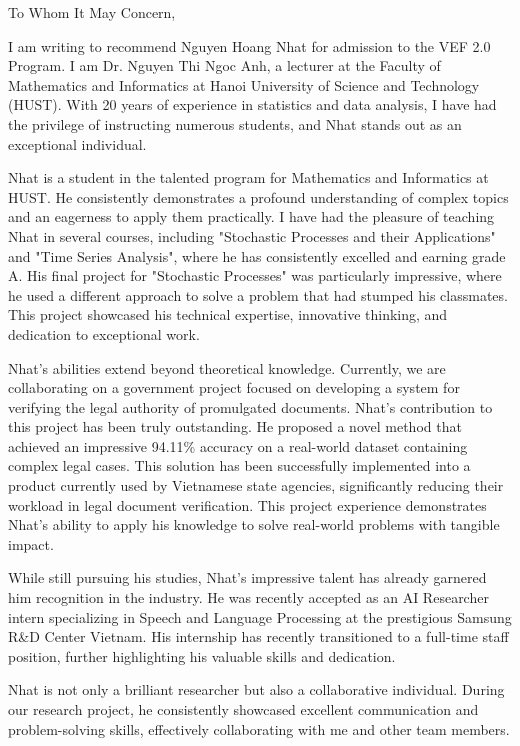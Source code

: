 To Whom It May Concern,

I am writing to recommend Nguyen Hoang Nhat for admission to the VEF 2.0 Program. I am Dr. Nguyen Thi Ngoc Anh, a lecturer at the Faculty of Mathematics and Informatics at Hanoi University of Science and Technology (HUST). With 20 years of experience in statistics and data analysis, I have had the privilege of instructing numerous students, and Nhat stands out as an exceptional individual.

Nhat is a student in the talented program for Mathematics and Informatics at HUST. He consistently demonstrates a profound understanding of complex topics and an eagerness to apply them practically. I have had the pleasure of teaching Nhat in several courses, including "Stochastic Processes and their Applications" and "Time Series Analysis", where he has consistently excelled and earning grade A. His final project for "Stochastic Processes" was particularly impressive, where he used a different approach to solve a problem that had stumped his classmates. This project showcased his technical expertise, innovative thinking, and dedication to exceptional work.

Nhat's abilities extend beyond theoretical knowledge. Currently, we are collaborating on a government project focused on developing a system for verifying the legal authority of promulgated documents.  Nhat's  contribution to this project has been truly outstanding.  He proposed a novel method that achieved an impressive 94.11\% accuracy on a real-world dataset containing complex legal cases.  This solution has been successfully implemented into a product currently used by Vietnamese state agencies, significantly reducing their workload in legal document verification.  This project experience demonstrates Nhat's ability to apply his knowledge to solve real-world problems with tangible impact.

While still pursuing his studies, Nhat's impressive talent has already garnered him recognition in the industry. He was recently accepted as an AI Researcher intern specializing in Speech and Language Processing at the prestigious Samsung R&D Center Vietnam.  His internship has recently transitioned to a full-time staff position, further highlighting his valuable skills and dedication.

Nhat is not only a brilliant researcher but also a collaborative individual. During our research project, he consistently showcased excellent communication and problem-solving skills, effectively collaborating with me and other team members.

